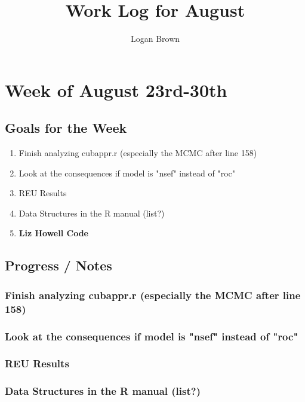 \documentclass[11pt]{article} %
\title{Work Log for August}
\author{Logan Brown}
\begin{document}
\maketitle


\setcounter{section}{03} %
\setcounter{subsection}{-1}
\setcounter{subsubsection}{0}

\section{Week of August 23rd-30th}
\subsection{Goals for the Week}
\begin{enumerate}
\item Finish analyzing cubappr.r (especially the MCMC after line 158)
\item Look at the consequences if model is "nsef" instead of "roc"
\item REU Results
\item Data Structures in the R manual (list?)
\item \textbf{Liz Howell Code}
\end{enumerate}

\subsection{Progress / Notes}

\subsubsection{Finish analyzing cubappr.r (especially the MCMC after line 158)}

\subsubsection{Look at the consequences if model is "nsef" instead of "roc"}

\subsubsection{REU Results}

\subsubsection{Data Structures in the R manual (list?)}
\end{document}
